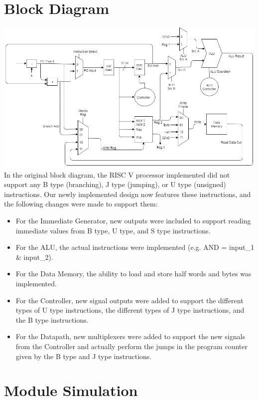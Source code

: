 \documentclass{article}
\begin{document}
	\section{Block Diagram}
		\includegraphics[width=1\textwidth]{block_diagram.png}
		In the original block diagram, the RISC V processor implemented did not support any B type (branching), J type (jumping), or U type (unsigned) instructions.
		Our newly implemented design now features these instructions, and the following changes were made to support them:
			\begin{itemize}\normalsize
				\item For the Immediate Generator, new outputs were included to support reading immediate values from B type, U type, and S type instructions.
				\item For the ALU, the actual instructions were implemented (e.g. AND = input\_1 \& input\_2).
				\item For the Data Memory, the ability to load and store half words and bytes was implemented.
				\item For the Controller, new signal outputs were added to support the different types of U type instructions, the different types of J type instructions,
						and the B type instructions.
				\item For the Datapath, new multiplexers were added to support the new signals from the Controller and actually perform the jumps in the program
						counter given by the B type and J type instructions.
			\end{itemize}			


	\Large
	\section{Module Simulation}
		\large
\end{document}
